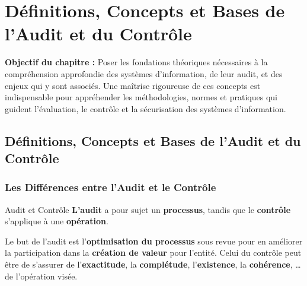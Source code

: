 
\chapter{Définitions, Concepts et Bases de l'Audit et du Contrôle}%
\label{chap:02_fondamentaux}

\begin{boxobjectifs}
\textbf{Objectif du chapitre :} Poser les fondations théoriques nécessaires à la
compréhension approfondie des systèmes d'information, de leur audit, et des enjeux
qui y sont associés. Une maîtrise rigoureuse de ces concepts est indispensable pour
appréhender les méthodologies, normes et pratiques qui guident l'évaluation, le
contrôle et la sécurisation des systèmes d'information.
\end{boxobjectifs}

\section{Définitions, Concepts et Bases de l'Audit et du Contrôle}

\subsection{Les Différences entre l'Audit et le Contrôle}

\begin{boxdef}{Audit et Contrôle}
\textbf{L'audit} a pour sujet un \textbf{processus}, tandis que le \textbf{contrôle}
s'applique à une \textbf{opération}.

Le but de l'audit est l'\textbf{optimisation du processus} sous revue pour en améliorer
la participation dans la \textbf{création de valeur} pour l'entité. Celui du contrôle
peut être de s'assurer de l'\textbf{exactitude}, la \textbf{complétude},
l'\textbf{existence}, la \textbf{cohérence}, \dots de l'opération visée.
\end{boxdef}

